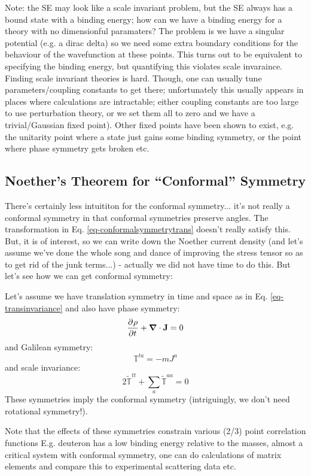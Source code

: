 Note: the SE may look like a scale invariant problem, but the SE always has a bound state with a binding energy; how can we have a binding energy for a theory with no dimensionful paramaters? The problem is we have a singular potential (e.g. a dirac delta) so we need some extra boundary conditions for the behaviour of the wavefunction at these points. This turns out to be equivalent to specifying the binding energy, but quantifying this violates scale invaraince. Finding scale invariant theories is hard. Though, one can usually tune parameters/coupling constants to get there; unfortunately this usually appears in places where calculations are intractable; either coupling constants are too large to use perturbation theory, or we set them all to zero and we have a trivial/Gaussian fixed point). Other fixed points have been shown to exist, e.g. the unitarity point where a state just gains some binding symmetry, or the point where phase symmetry gets broken etc.

\subsection{Noether's Theorem for ``Conformal'' Symmetry}
There's certainly less intuititon for the conformal symmetry... it's not really a conformal symmetry in that conformal symmetries preserve angles. The transformation in Eq. \eqref{eq-conformalsymmetrytrans} doesn't really satisfy this. But, it is of interest, so we can write down the Noether current density (and let's assume we've done the whole song and dance of improving the stress tensor so as to get rid of the junk terms...) - actually we did not have time to do this. But let's see how we can get conformal symmetry:

Let's assume we have translation symmetry in time and space as in Eq. \eqref{eq-transinvariance} and also have phase symmetry:
\begin{equation}
    \dpd{\rho}{t} + \nabla \cdot \v{J} = 0
\end{equation}
and Galilean symmetry:
\begin{equation}
    \mathbb{T}^{ta} = -mJ^a
\end{equation}
and scale invariance:
\begin{equation}
    2\tilde{\mathbb{T}}^{tt} + \sum_a \tilde{\mathbb{T}}^{aa} = 0
\end{equation}
These symmetries imply the conformal symmetry (intriguingly, we don't need rotational symmetry!). 

Note that the effects of these symmetries constrain various (2/3) point correlation functions E.g. deuteron has a low binding energy relative to the masses, almost a critical system with conformal symmetry, one can do calculations of matrix elements and compare this to experimental scattering data etc.

